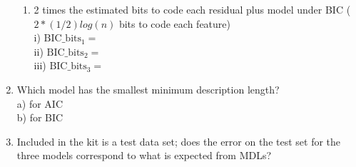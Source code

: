 \documentclass[english]{article}
\begin{document}
\begin{enumerate}
\begin{enumerate}
\item 2 times the estimated bits to code each residual plus model under BIC  ($2*(1/2) log(n)$ bits to code each feature) \\
i)   $\text{BIC}\_\text{bits}_1 = $ \\
ii)  $\text{BIC}\_\text{bits}_2 = $ \\
iii) $\text{BIC}\_\text{bits}_3 = $ \\

\end{enumerate}

\item Which model has the smallest minimum description length? \\
a) for AIC \\
b) for BIC\\

\item  Included in the kit is a test data set; does the error on the test set for the three models
   correspond to what is expected from MDLs? 

\end{enumerate}
\end{document}
